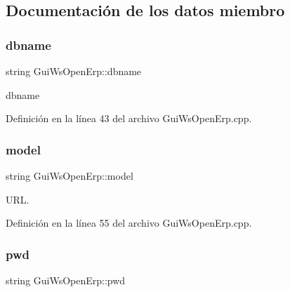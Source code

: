 \subsection{Documentación de los datos miembro}
\hypertarget{classGuiWsOpenErp_aa872d8ffb6c11032ec0dcfd8ee49e234}{}\label{classGuiWsOpenErp_aa872d8ffb6c11032ec0dcfd8ee49e234} 
\subsubsection{\texorpdfstring{dbname}{dbname}}
{\footnotesize\ttfamily string Gui\+Ws\+Open\+Erp\+::dbname\hspace{0.3cm}{\ttfamily [private]}}



dbname 



Definición en la línea 43 del archivo Gui\+Ws\+Open\+Erp.\+cpp.

\hypertarget{classGuiWsOpenErp_aa01da7bfce4fce442c869c6d1c988c4b}{}\label{classGuiWsOpenErp_aa01da7bfce4fce442c869c6d1c988c4b} 
\subsubsection{\texorpdfstring{model}{model}}
{\footnotesize\ttfamily string Gui\+Ws\+Open\+Erp\+::model\hspace{0.3cm}{\ttfamily [private]}}



U\+RL. 



Definición en la línea 55 del archivo Gui\+Ws\+Open\+Erp.\+cpp.

\hypertarget{classGuiWsOpenErp_ad82141631eb4a41cd62b1c8892424a92}{}\label{classGuiWsOpenErp_ad82141631eb4a41cd62b1c8892424a92} 
\subsubsection{\texorpdfstring{pwd}{pwd}}
{\footnotesize\ttfamily string Gui\+Ws\+Open\+Erp\+::pwd\hspace{0.3cm}{\ttfamily [private]}}



